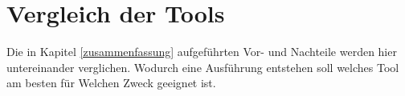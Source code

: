 \section{Vergleich der Tools}\label{vergleich}

Die in Kapitel \ref{zusammenfassung} aufgeführten Vor- und Nachteile werden hier
untereinander verglichen. Wodurch eine Ausführung entstehen soll welches Tool
am besten für Welchen Zweck geeignet ist.
